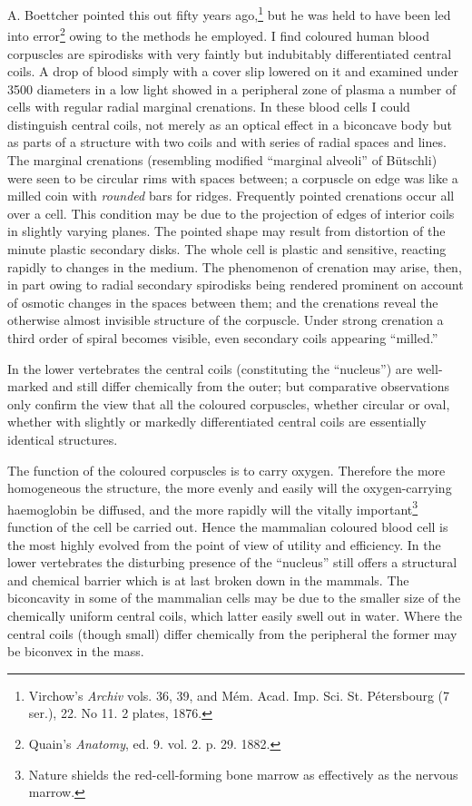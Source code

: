 \documentclass[a4paper, 12pt, oneside]{article}
\begin{document}
A. Boettcher pointed this out fifty years ago,\footnote{Virchow's \emph{Archiv} vols. 36, 39, and Mém. Acad. Imp. Sci. St. Pétersbourg (7 ser.), 22. No 11. 2 plates, 1876.} but he was held to have been led into error\footnote{Quain's \emph{Anatomy}, ed. 9. vol. 2. p. 29. 1882.} owing to the methods he employed. I find coloured human blood corpuscles are spirodisks with very faintly but indubitably differentiated central coils. A drop of blood simply with a cover slip lowered on it and examined under 3500 diameters in a low light showed in a peripheral zone of plasma a number of cells with regular radial marginal crenations. In these blood cells I could distinguish central coils, not merely as an optical effect in a biconcave body but as parts of a structure with two coils and with series of radial spaces and lines. The marginal crenations (resembling modified ``marginal alveoli'' of Bütschli) were seen to be circular rims with spaces between; a corpuscle on edge was like a milled coin with \emph{rounded} bars for ridges. Frequently pointed crenations occur all over a cell. This condition may be due to the projection of edges of interior coils in slightly varying planes. The pointed shape may result from distortion of the minute plastic secondary disks. The whole cell is plastic and sensitive, reacting rapidly to changes in the medium. The phenomenon of crenation may arise, then, in part owing to radial secondary spirodisks being rendered prominent on account of osmotic changes in the spaces between them; and the crenations reveal the otherwise almost invisible structure of the corpuscle. Under strong crenation a third order of spiral becomes visible, even secondary coils appearing ``milled.''

In the lower vertebrates the central coils (constituting the ``nucleus'') are well-marked and still differ chemically from the outer; but comparative observations only confirm the view that all the coloured corpuscles, whether circular or oval, whether with slightly or markedly differentiated central coils are essentially identical structures.

The function of the coloured corpuscles is to carry oxygen. Therefore the more homogeneous the structure, the more evenly and easily will the oxygen-carrying haemoglobin be diffused, and the more rapidly will the vitally important\footnote{Nature shields the red-cell-forming bone marrow as effectively as the nervous marrow.} function of the cell be carried out. Hence the mammalian coloured blood cell is the most highly evolved from the point of view of utility and efficiency. In the lower vertebrates the disturbing presence of the ``nucleus'' still offers a structural and chemical barrier which is at last broken down in the mammals. The biconcavity in some of the mammalian cells may be due to the smaller size of the chemically uniform central coils, which latter easily swell out in water. Where the central coils (though small) differ chemically from the peripheral the former may be biconvex in the mass.
\end{document}
